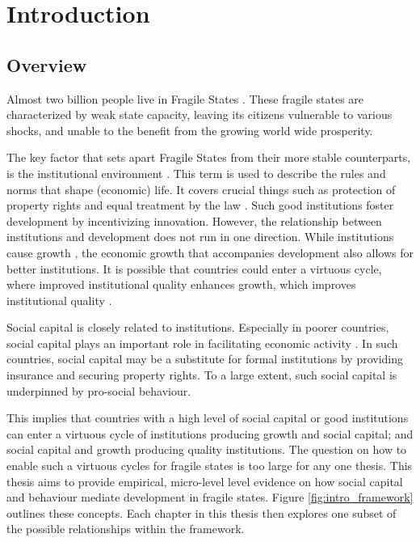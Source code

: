 \chapter{Introduction}
\section{Overview}



Almost two billion people live in Fragile States . These fragile states are characterized by weak state capacity, leaving its citizens vulnerable to various shocks, and unable to the benefit from the growing world wide prosperity. 

The key factor that sets apart Fragile States from their more stable counterparts, is the institutional environment \citep{Rodrik2004,Acemoglu2000}. This term is used to describe the rules and norms that shape (economic) life. It covers crucial things such as protection of property rights and equal treatment by the law \citep{Acemoglu2005}. Such good institutions  foster development by incentivizing innovation. However, the relationship between institutions and development does not run in one direction. While institutions cause growth \citep{Acemoglu2000}, the economic growth that accompanies development also allows for better institutions. It is possible that countries could enter a virtuous cycle, where improved institutional quality enhances growth, which improves institutional quality \citep{Voors2011}.

%
Social capital is closely related to institutions.  Especially in poorer countries, social capital plays an important role in facilitating economic activity \citep{Knack1997}. In such countries, social capital may be a substitute for formal institutions by providing insurance and securing property rights. To a large extent, such social capital is underpinned by pro-social behaviour. 


This implies that countries with a high level of social capital or good institutions can enter a virtuous cycle of institutions producing growth and social capital; and social capital and growth producing quality institutions. The question on how to enable such a virtuous cycles for fragile states is too large for any one thesis. This thesis aims to provide empirical, micro-level level evidence on how social capital and behaviour mediate development in fragile states. Figure \ref{fig:intro_framework} outlines these concepts. Each chapter in this thesis then explores one subset of the possible relationships within the framework.

